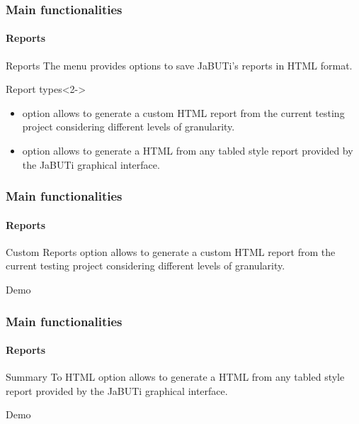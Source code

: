 \begin{frame}[parent={cmap:jabuti-gui},hasnext=true,hasprev=true]
\frametitle{Main functionalities}
\framesubtitle{Reports}
\label{concept:reports-menu}

\begin{block}{Reports}
The  menu provides options to save JaBUTi's reports in HTML
format.
\end{block}

\begin{block}{Report types}<2->
\begin{itemize}
	\item<+->  option allows to generate a custom HTML
	report from the current testing project considering different levels of
	granularity.

	\item<+->  option allows to generate a HTML from
	any tabled style report provided by the JaBUTi graphical interface.
\end{itemize}
\end{block}

\end{frame}


\begin{frame}
\frametitle{Main functionalities}
\framesubtitle{Reports}
\label{concept:custom-reports}

\begin{block}{Custom Reports}
 option allows to generate a custom HTML report from
the current testing project considering different levels of granularity.
\end{block}

\begin{block}{Demo}
\end{block}
\end{frame}


\begin{frame}
\frametitle{Main functionalities}
\framesubtitle{Reports}
\label{concept:summary-to-html}

\begin{block}{Summary To HTML}
 option allows to generate a HTML from any tabled
style report provided by the JaBUTi graphical interface.
\end{block}

\begin{block}{Demo}
\end{block}
\end{frame}
